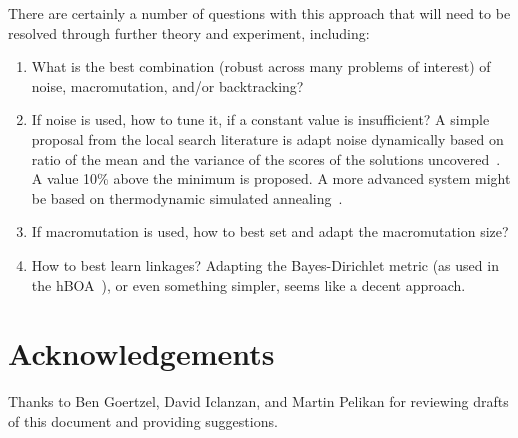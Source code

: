 \documentclass[letterpaper]{article}
\begin{document}
There are certainly a number of questions with this approach that will need to
be resolved through further theory and experiment, including:
\begin{enumerate}
\item What is the best combination (robust across many problems of interest) of
  noise, macromutation, and/or backtracking?
\item If noise is used, how to tune it, if a constant value is insufficient? A
  simple proposal from the local search literature is adapt noise dynamically
  based on ratio of the mean and the variance of the scores of the solutions
  uncovered~\cite{ls_invariants}. A value 10\% above the minimum is proposed. A
  more advanced system might be based on thermodynamic simulated
  annealing~\cite{tsa}.
\item If macromutation is used, how to best set and adapt the macromutation
  size?
\item How to best learn linkages? Adapting the Bayes-Dirichlet metric (as used
  in the hBOA~\cite{hBOA}), or even something simpler, seems like a decent
  approach.
\end{enumerate}

\section{Acknowledgements}

Thanks to Ben Goertzel, David Iclanzan, and Martin Pelikan for reviewing drafts
of this document and providing suggestions.



\end{document}
